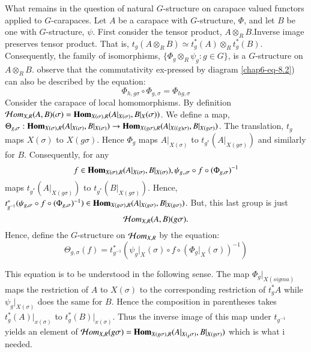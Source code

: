 What remains in the question of natural $G$-structure on carapace valued functors applied to $G$-carapaces. Let $A$ be a carapace with $G$-structure, $\Phi$, and let $B$ be one with $G$-structure, $\psi$. First consider the tensor product, $A \otimes_{R}B$.\pageoriginale Inverse image preserves tensor product. That is, $t_{{g}}(A \otimes_{R}B)\simeq t_{{g}}^{*}(A)\otimes_{R} t_{{g}}^{*}(B)$. Consequently, the family of isomorphisms, $\{\Phi_{g} \otimes_{R} \psi_{{g}} : {g} \in G \}$, is a $G$-structure on $A \otimes_{R} B$. observe that the commutativity ex-pressed by diagram \ref{chap6-eq-8.2}) can also be described by the equation:
\begin{equation*}\label{chap6-eq-8.5}
\Phi_{h,{g}\sigma} \circ \Phi_{g, \sigma} = \Phi_{h {g}, \sigma}\tag{8.5}
\end{equation*}
Consider the carapace of local homomorphisms. By definition\break $\mathcal{H} om_{X,R}(A, B)(\sigma) = \operatorname{\mathbf{Hom}}_{X(\sigma), R}(A|_{X(\sigma)}, B|_{X}(\sigma))$. We define a map, $\Theta_{{g}, \sigma} : \operatorname{\mathbf{Hom}}_{X (\sigma),R}(A|_{X(\sigma)}, B|_{X(\sigma)})\rightarrow \operatorname{\mathbf{Hom}}_{X({g}\sigma),R}(A|_{X((g)\sigma)}, B|_{X({g}\sigma)})$. The translation, $t_{{g}}$ maps $X(\sigma)$ to $X({g}\sigma)$. Hence $\Phi_{{g}}$ maps $A|_{X(\sigma)}$ to $t_{{g}^{*}}(A|_{X({g}\sigma)})$ and similarly for $B$. Consequently, for any 
$$
f \in \operatorname{\mathbf{Hom}}_{X(\sigma),R}(A|_{X(\sigma)}, B|_{X(\sigma)}), \psi_{{g},,\sigma} \circ f \circ (\Phi_{{g}, \sigma})^{-1}
$$ 
maps $t_{{g}^{*}}(A|_{X({g}\sigma)})$ to $t_{{g}^{*}}(B|_{X({g}\sigma)})$. Hence, $t_{{g}^{-1}}^{*}(\psi_{{g}, \sigma} \circ f \circ (\Phi_{{g},\sigma})^{-1}) \in \operatorname{\mathbf{Hom}}_{X({g}\sigma), R}(A|_{X({g}\sigma)}, B|_{X({g}\sigma)})$. But, this last group is just 
$$
\mathcal{H} om_{X, R}(A, B)({g}\sigma).
$$ 
Hence, define the $G$-structure on $\mathcal{H} om_{X, R}$ by the equation:
\begin{equation*}\label{chap6-eq-8.6}
\Theta_{{g}, \sigma}(f) = t_{{g}^{-1}}^{*}(\psi_{{g}}|_{X}({\sigma}) \circ f \circ (\Phi_{{g}}|_{X}{(\sigma)})^{-1})\tag{8.6}
\end{equation*} 

This equation is to be understood in the following sense. The map $\Phi_{{g}}|_{X(sigma)}$ maps the restriction of $A$ to $X(\sigma)$ to the corresponding restriction of $t_{{g}}^{*} A$ while $\psi_{{g}}|_{X(\sigma)}$ does the same for $B$. Hence the composition in parentheses takes $t_{{g}}^{*}(A)|_{x(\sigma)}$ to $t_{{g}}^{*}(B)|_{x(\sigma)}$. Thus the inverse image of this map under $t_{{g}^{-1}}$ yields an element of $\calH om_{X, R}({g}\sigma) = \bHom_{X({g}\sigma), R}\break (A|_{X(_{g}\sigma)}, B|_{X({g}\sigma)})$ which is what i needed.

